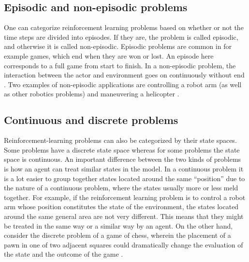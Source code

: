 \subsection{Episodic and non-episodic problems}
One can categorize reinforcement learning problems based on whether or not the time steps are divided into episodes. If they are, the problem is called episodic, and otherwise it is called non-episodic. Episodic problems are common in for example games, which end when they are won or lost. An episode here corresponds to a full game from start to finish. In a non-episodic problem, the interaction between the actor and environment goes on continuously without end \parencite{barto1998reinforcement}. Two examples of non-episodic applications are controlling a robot arm (as well as other robotics problems) and maneuvering a helicopter \parencite{ng2006autonomous}. 

\subsection{Continuous and discrete problems}
Reinforcement-learning problems can also be categorized by their state spaces. Some problems have a discrete state space whereas for some problems the state space is continuous. An important difference between the two kinds of problems is how an agent can treat similar states in the model. In a continuous problem it is a lot easier to group together states located around the same ``position'' due to the nature of a continuous problem, where the states usually more or less meld together. For example, if the reinforcement learning problem is to control a robot arm whose position constitutes the state of the environment, the states located around the same general area are not very different. This means that they might be treated in the same way or a similar way by an agent. On the other hand, consider the discrete problem of a game of chess, wherein the placement of a pawn in one of two adjacent squares could dramatically change the evaluation of the state and the outcome of the game \parencite{barto1998reinforcement}.
